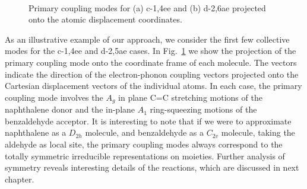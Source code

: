 
\begin{figure}[t]
\\
\caption{
Primary coupling modes for (a) c-1,4ee and (b) d-2,6ae projected onto the atomic displacement coordinates.
}\label{LanczosModes_chap2}
\end{figure}


As an illustrative example of our approach, we consider the
first few collective modes for the c-1,4ee and d-2,5ae cases.
 In Fig.~\ref{LanczosModes_chap2}
we show the projection of the primary coupling mode onto the
coordinate frame of each molecule.  The vectors indicate the direction
of the electron-phonon coupling vectors projected onto the Cartesian displacement
vectors of the individual atoms.   In each case, the primary
coupling mode involves the  $A_{g}$ in plane C=C stretching motions of the naphthalene donor and the
 in-plane $A_1$ ring-squeezing motions of the benzaldehyde acceptor.
It is interesting to note that
if we were to approximate naphthalene as a $D_{2h}$ molecule, and benzaldehyde as a $C_{2v}$ molecule, taking the aldehyde as local site, the primary coupling modes always correspond to the totally symmetric irreducible representations on moieties. Further analysis of symmetry reveals interesting details of the reactions, which are discussed in next chapter.



